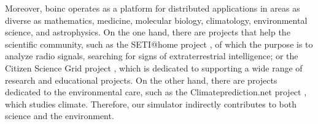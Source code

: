 Moreover, \gls{boinc} operates as a platform for distributed applications in areas as diverse as mathematics, medicine, molecular biology, climatology, environmental science, and astrophysics. On the one hand, there are projects that help the scientific community, such as the SETI@home project \cite{Anderson2002SETI@home}, of which the purpose is to analyze radio signals, searching for signs of extraterrestrial intelligence; or the Citizen Science Grid project \cite{csgproject}, which is dedicated to supporting a wide range of research and educational projects. On the other hand, there are projects dedicated to the environmental care, such as the Climateprediction.net project \cite{climateprediction}, which studies climate. Therefore, our simulator indirectly contributes to both science and the environment.


